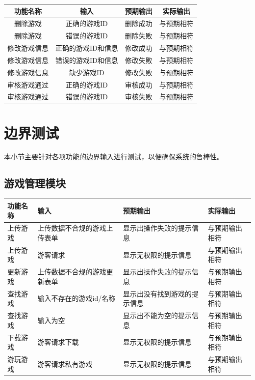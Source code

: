 \documentclass[12pt]{ctexart} %
\begin{document}
\begin{table}[H]
  \centering
  \begin{tabular}{|c|c|c|c|}
    \hline
    功能名称 & 输入 & 预期输出 & 实际输出 \\
    \hline
    删除游戏 & 正确的游戏ID & 删除成功 & 与预期相符 \\
    \hline
    删除游戏 & 错误的游戏ID & 删除失败 & 与预期相符 \\
    \hline
    修改游戏信息 & 正确的游戏ID和信息 & 修改成功 & 与预期相符 \\
    \hline
    修改游戏信息 & 错误的游戏ID和信息 & 修改失败 & 与预期相符 \\
    \hline
    修改游戏信息 & 缺少游戏ID & 修改失败 & 与预期相符 \\
    \hline
    审核游戏通过 & 正确的游戏ID & 审核成功 & 与预期相符 \\
    \hline
    审核游戏通过 & 错误的游戏ID & 审核失败 & 与预期相符 \\
    \hline
  \end{tabular}
\end{table}

\section{边界测试}
本小节主要针对各项功能的边界输入进行测试，以便确保系统的鲁棒性。 
\subsection{游戏管理模块}

\begin{table}[H]
\centering
\renewcommand{\arraystretch}{1.5} 
\begin{tabular}{|>{\centering\arraybackslash}p{2cm}|>{\raggedright\arraybackslash}p{5cm}|>{\raggedright\arraybackslash}p{5cm}|>{\raggedright\arraybackslash}p{4cm}|}
\hline
\textbf{功能名称} & \textbf{输入} & \textbf{预期输出} & \textbf{实际输出} \\
\hline
上传游戏 & 上传数据不合规的游戏上传表单 & 显示出操作失败的提示信息 & 与预期输出相符 \\
\hline
上传游戏 & 游客请求 & 显示无权限的提示信息 & 与预期输出相符 \\
\hline
更新游戏 & 上传数据不合规的游戏更新表单 & 显示出操作失败的提示信息 & 与预期输出相符 \\
\hline
查找游戏 & 输入不存在的游戏id/名称 & 显示出没有找到游戏的提示信息 & 与预期输出相符 \\
\hline
查找游戏 & 输入为空 & 显示出不能为空的提示信息 & 与预期输出相符 \\
\hline
下载游戏 & 游客请求下载 & 显示无权限的提示信息 & 与预期输出相符 \\
\hline
游玩游戏 & 游客请求私有游戏 & 显示无权限的提示信息 & 与预期输出相符 \\
\hline
\end{tabular}
\end{table}
\end{document}
